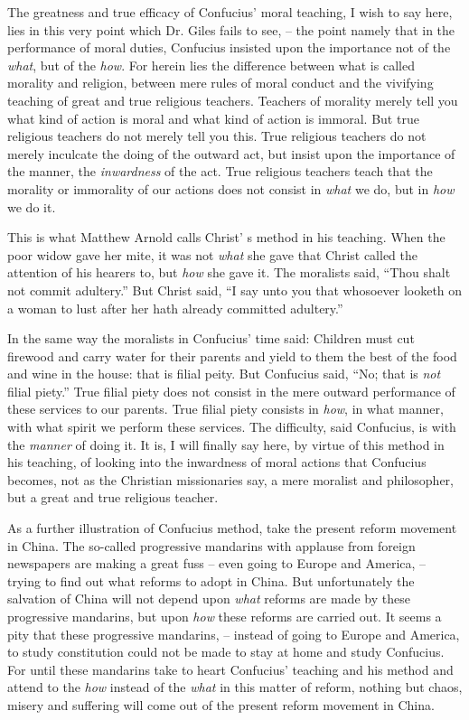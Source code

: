 The greatness and true efficacy of Confucius' moral teaching,
I wish to say here, lies in this very point which Dr. Giles fails to see,
-- the point namely that in the performance of moral duties,
Confucius insisted upon the importance not of the \emph{what}, but of the \emph{how}.
For herein lies the difference between what is called morality and religion,
between mere rules of moral conduct and the vivifying teaching of great and true religious teachers.
Teachers of morality merely tell you what kind of action is moral and
what kind of action is immoral.
But true religious teachers do not merely tell you this.
True religious teachers do not merely inculcate the doing of the outward act,
but insist upon the importance of the manner, the \emph{inwardness} of the act.
True religious teachers teach that the morality or immorality of our actions
does not consist in \emph{what} we do, but in \emph{how} we do it.

This is what Matthew Arnold calls Christ' s method in his teaching.
When the poor widow gave her mite, it was not \emph{what} she gave that Christ called the attention of his hearers to,
but \emph{how} she gave it.
The moralists said, ``Thou shalt not commit adultery.''
But Christ said, ``I say unto you that whosoever looketh on a woman to lust after her hath already committed adultery.''

In the same way the moralists in Confucius' time said:
Children must cut firewood and carry water for their parents
and yield to them the best of the food and wine in the house: that is filial peity.
But Confucius said, ``No; that is \emph{not} filial piety.''
True filial piety does not consist in the mere outward performance of these services to our parents.
True filial piety consists in \emph{how}, in what manner,
with what spirit we perform these services.
The difficulty, said Confucius, is with the \emph{manner} of doing it.
It is, I will finally say here, by virtue of this method in his teaching,
of looking into the inwardness of moral actions that Confucius becomes,
not as the Christian missionaries say, a mere moralist and philosopher,
but a great and true religious teacher.

As a further illustration of Confucius method, take the present reform movement in China.
The so-called progressive mandarins with applause from foreign newspapers are making a great fuss
-- even going to Europe and America,
-- trying to find out what reforms to adopt in China.
But unfortunately the salvation of China will not depend upon \emph{what} reforms are made by these progressive mandarins,
but upon \emph{how} these reforms are carried out.
It seems a pity that these progressive mandarins,
-- instead of going to Europe and America, to study constitution could not be made to stay at home and study Confucius.
For until these mandarins take to heart Confucius' teaching and his method and attend to the \emph{how} instead of the \emph{what} in this matter of reform,
nothing but chaos, misery and suffering will come out of the present reform movement in China.

